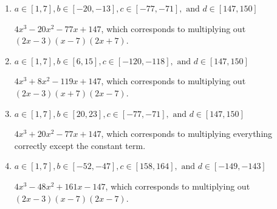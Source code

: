 \documentclass{extbook}[14pt]
\begin{document}
\begin{enumerate}
{\begin{enumerate}[label=\Alph*.]
* $4x^{3} +20 x^{2} -77 x -147$, which is the correct option.
\item \( a \in [1, 7], b \in [-20, -13], c \in [-77, -71], \text{ and } d \in [147, 150] \)

$4x^{3} -20 x^{2} -77 x + 147$, which corresponds to multiplying out $(2x -3)(x -7)(2x + 7)$.
\item \( a \in [1, 7], b \in [6, 15], c \in [-120, -118], \text{ and } d \in [147, 150] \)

$4x^{3} +8 x^{2} -119 x + 147$, which corresponds to multiplying out $(2x -3)(x + 7)(2x -7)$.
\item \( a \in [1, 7], b \in [20, 23], c \in [-77, -71], \text{ and } d \in [147, 150] \)

$4x^{3} +20 x^{2} -77 x + 147$, which corresponds to multiplying everything correctly except the constant term.
\item \( a \in [1, 7], b \in [-52, -47], c \in [158, 164], \text{ and } d \in [-149, -143] \)

$4x^{3} -48 x^{2} +161 x -147$, which corresponds to multiplying out $(2x -3)(x -7)(2x -7)$.
\end{enumerate}

}
\end{enumerate}
\end{document}
